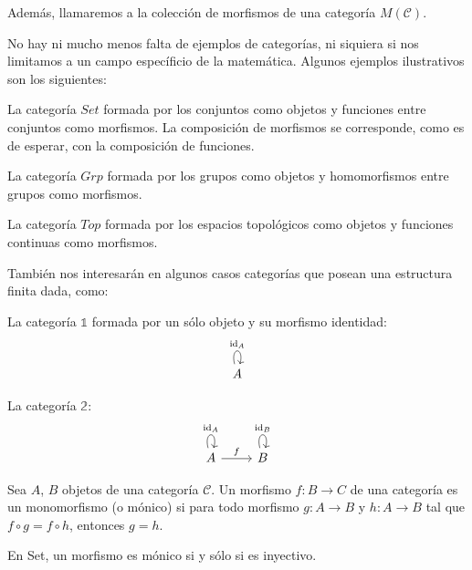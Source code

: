 \documentclass[12pt, twoside]{book}
\newcommand{\cat}{{\mathcal{C}}}
\newcommand{\Set}{{Set}}
\newcommand{\Grp}{{Grp}}
\newcommand{\Top}{{Top}}
\DeclareMathOperator{\id}{id}
\begin{document}
Además, llamaremos a la colección de morfismos de una categoría $M(\cat)$.

No hay ni mucho menos falta de ejemplos de categorías, ni siquiera si nos limitamos a un campo específicio de la matemática.
Algunos ejemplos ilustrativos son los siguientes:

\begin{example}
La categoría $\Set$ formada por los conjuntos como objetos y funciones entre conjuntos como morfismos.
La composición de morfismos se corresponde, como es de esperar, con la composición de funciones.
\end{example}

\begin{example}
La categoría $\Grp$ formada por los grupos como objetos y homomorfismos entre grupos como morfismos.
\end{example}

\begin{example}
La categoría $\Top$ formada por los espacios topológicos como objetos y funciones continuas como morfismos.
\end{example}

También nos interesarán en algunos casos categorías que posean una estructura finita dada, como:
\begin{example}
La categoría $\mathbb{1}$ formada por un sólo objeto y su morfismo identidad:
\[ \begin{tikzcd}
A \arrow[loop above,"\id_A"]
\end{tikzcd}\]
\end{example}

\begin{example}
La categoría $\mathbb{2}$:
\[ \begin{tikzcd}
A \arrow[loop above,"\id_A"] \arrow[r,"f"] & B \arrow[loop above,"\id_B"]
\end{tikzcd}\]
\end{example}

\begin{definition}
Sea $A$, $B$ objetos de una categoría $\cat$.
Un morfismo $f \colon B \to C$ de una categoría es un monomorfismo (o mónico) si para todo morfismo $g \colon A \to B$ y $h \colon A \to B$ tal que $f \circ g = f \circ h$, entonces $g = h$.
\end{definition}

\begin{proposition}
En \Set, un morfismo es mónico si y sólo si es inyectivo.
\end{proposition}
\end{document}
